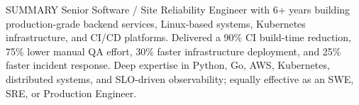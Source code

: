 \documentclass{resume} %
\begin{document}
\vspace{-7pt}
\begin{rSection}{SUMMARY}
{Senior Software / Site Reliability Engineer with 6+ years building production-grade backend services, Linux-based systems, Kubernetes infrastructure, and CI/CD platforms. Delivered a 90\% CI build-time reduction, 75\% lower manual QA effort, 30\% faster infrastructure deployment, and 25\% faster incident response. Deep expertise in Python, Go, AWS, Kubernetes, distributed systems, and SLO-driven observability; equally effective as an SWE, SRE, or Production Engineer.}



\end{rSection}
\end{document}
